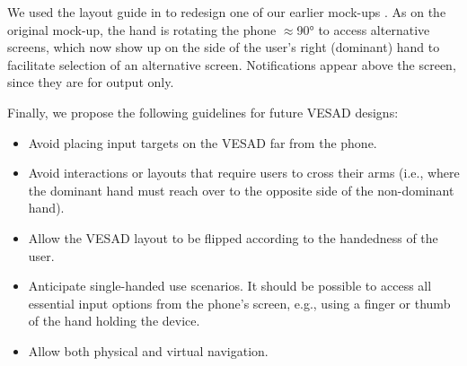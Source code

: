 
We used the layout guide in  to redesign one of our earlier mock-ups . As on the original mock-up, the hand is rotating the phone $\approx$\ang{90} to access alternative screens, which now show up on the side of the user's right (dominant) hand to facilitate selection of an alternative screen. Notifications appear above the screen, since they are for output only.

Finally, we propose the following guidelines for future VESAD designs:

\begin{itemize}
 \item Avoid placing input targets on the VESAD far from the phone.
 \item Avoid interactions or layouts that require users to cross their arms (i.e., where the dominant hand must reach over to the opposite side of the non-dominant hand).
 \item Allow the VESAD layout to be flipped according to the handedness of the user.
 \item Anticipate single-handed use scenarios. It should be possible to access all essential input options from the phone's screen, e.g., using a finger or thumb of the hand holding the device.
 \item Allow both physical and virtual navigation.
\end{itemize}



